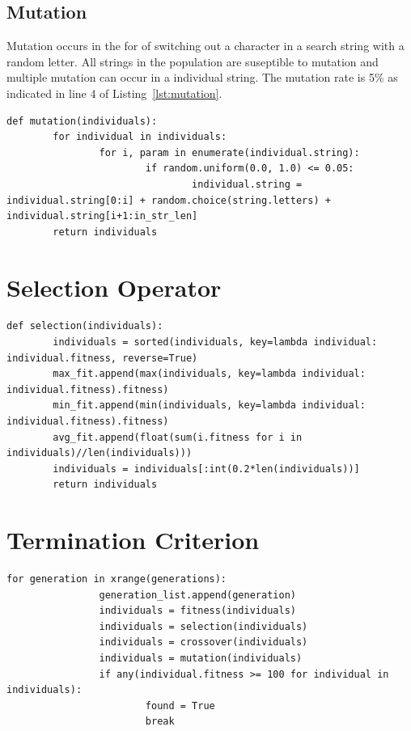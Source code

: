 \documentclass[12pt]{article}
\begin{document}
\subsection{Mutation}

Mutation occurs in the for of switching out a character in a search string with
a random letter.  All strings in the population are suseptible to mutation and
multiple mutation can occur in a individual string.  The mutation rate is 5\% as
indicated in line 4 of Listing~\ref{lst:mutation}.

\begin{lstlisting}[caption = {Mutation Function}, label={lst:mutation}]
def mutation(individuals):
        for individual in individuals:
                for i, param in enumerate(individual.string):
                        if random.uniform(0.0, 1.0) <= 0.05:
                                individual.string = individual.string[0:i] + random.choice(string.letters) + individual.string[i+1:in_str_len]
        return individuals
\end{lstlisting}


\section{Selection Operator}

\begin{lstlisting}[caption = {}]
def selection(individuals):
        individuals = sorted(individuals, key=lambda individual: individual.fitness, reverse=True)
        max_fit.append(max(individuals, key=lambda individual: individual.fitness).fitness)
        min_fit.append(min(individuals, key=lambda individual: individual.fitness).fitness)
        avg_fit.append(float(sum(i.fitness for i in individuals)//len(individuals)))
        individuals = individuals[:int(0.2*len(individuals))]
        return individuals
\end{lstlisting}

\section{Termination Criterion}

\begin{lstlisting}[caption={}]
 for generation in xrange(generations):
                generation_list.append(generation)
                individuals = fitness(individuals)
                individuals = selection(individuals)
                individuals = crossover(individuals)
                individuals = mutation(individuals)
                if any(individual.fitness >= 100 for individual in individuals):
                        found = True
                        break
\end{lstlisting}
\end{document}
